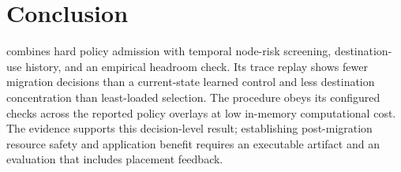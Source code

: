 \section{Conclusion}\label{sec:conclusion}
\cage combines hard policy admission with temporal node-risk screening,
destination-use history, and an empirical headroom check. Its trace replay
shows fewer migration decisions than a current-state learned control and
less destination concentration than least-loaded selection. The procedure
obeys its configured checks across the reported policy overlays at low
in-memory computational cost. The evidence supports this decision-level
result; establishing post-migration resource safety and application benefit
requires an executable artifact and an evaluation that includes placement
feedback.
